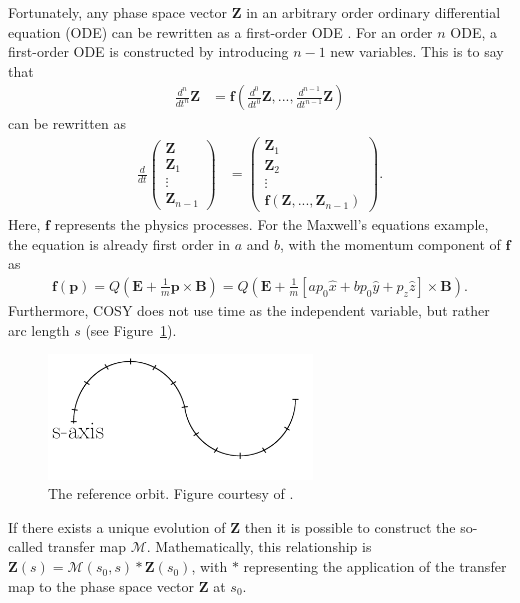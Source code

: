 Fortunately, any phase space vector $\mathbf{Z}$ in an arbitrary order ordinary differential equation (ODE) can be rewritten as a first-order ODE \cite{modernMapMethods}. For an order $n$ ODE, a first-order ODE is constructed by introducing $n-1$ new variables. This is to say that
\begin{align} \nonumber
\frac{d^n}{dt^n}\mathbf{Z}&=\mathbf{f}(\frac{d^0}{dt^0}\mathbf{Z},...,\frac{d^{n-1}}{dt^{n-1}}\mathbf{Z})
\end{align}
can be rewritten as
\begin{align} \nonumber
\frac{d}{dt} \begin{pmatrix}
		\mathbf{Z} \\ \mathbf{Z}_1 \\ \vdots \\ \mathbf{Z}_{n-1}
		\end{pmatrix}
&= 		\begin{pmatrix}
		\mathbf{Z}_1 \\ \mathbf{Z}_2 \\ \vdots \\ \mathbf{f}(\mathbf{Z},...,\mathbf{Z}_{n-1})
		\end{pmatrix}.
\end{align}
Here, $\mathbf{f}$ represents the physics processes. For the Maxwell's equations example, the equation is already first order in $a$ and $b$, with the momentum component of $\mathbf{f}$ as
\begin{align}\nonumber
\mathbf{f}(\mathbf{p})=Q(\mathbf{E}+\frac{1}{m}\mathbf{p}\times\mathbf{B})=Q(\mathbf{E}+\frac{1}{m}\left[ap_0 \hat{x} + bp_0\hat{y} + p_z \hat{z}\right]\times\mathbf{B}).
\end{align}
 Furthermore, COSY does not use time as the independent variable, but rather arc length $s$ (see Figure~\ref{fig:saxis}).

\begin{figure}[h!]
\centering
\includegraphics*[width=70mm]{./Figures/saxis}
\caption{The reference orbit. Figure courtesy of \cite{berzFullnotes}.}
\label{fig:saxis}
\end{figure}

If there exists a unique evolution of $\mathbf{Z}$ then it is possible to construct the so-called transfer map $\mathcal{M}$. Mathematically, this relationship is $\mathbf{Z}(s)=\mathcal{M}(s_0 , s)*\mathbf{Z}(s_0)$, with $*$ representing the application of the transfer map to the phase space vector $\mathbf{Z}$ at $s_0$. 

